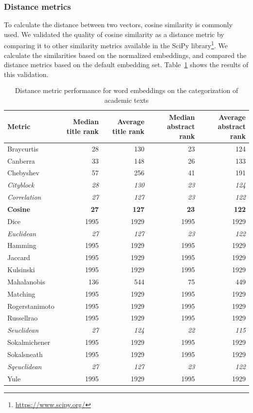 \documentclass[../../Thesis.tex]{subfiles}
\begin{document}
\subsubsection{Distance metrics}
To calculate the distance between two vectors, cosine similarity is commonly used. We validated the quality of cosine similarity as a distance metric by comparing it to other similarity metrics available in the SciPy library\footnote{\url{https://www.scipy.org/}}. We calculate the similarities based on the normalized embeddings, and compared the distance metrics based on the default embedding set. Table~\ref{table:distanceMetrics} shows the results of this validation.\\
\begin{table}[hbt]
\begin{tabular}{|l|r|r|r|r|}
\hline
Metric\footnotemark & Median title rank & Average title rank & Median abstract rank & Average abstract rank  \\
\hline
Braycurtis & 28 & 130 & 23 & 124  \\
\hline
Canberra & 33 & 148 & 26 & 133  \\
\hline
Chebyshev & 57 & 256 & 41 & 191  \\
\hline
\textit{Cityblock} & \textit{28} & \textit{130} & \textit{23} & \textit{124}  \\
\hline
\textit{Correlation} & \textit{27} & \textit{127} & \textit{23} & \textit{122}  \\
\hline
\textbf{Cosine} & \textbf{27} & \textbf{127} & \textbf{23} & \textbf{122}  \\
\hline
Dice & 1995 & 1929 & 1995 & 1929  \\
\hline
\textit{Euclidean} & \textit{27} & \textit{127} & \textit{23} & \textit{122}  \\
\hline
Hamming & 1995 & 1929 & 1995 & 1929  \\
\hline
Jaccard & 1995 & 1929 & 1995 & 1929  \\
\hline
Kulsinski & 1995 & 1929 & 1995 & 1929  \\
\hline
Mahalanobis & 136 & 544 & 75 & 449  \\
\hline
Matching & 1995 & 1929 & 1995 & 1929  \\
\hline
Rogerstanimoto & 1995 & 1929 & 1995 & 1929  \\
\hline
Russellrao & 1995 & 1929 & 1995 & 1929  \\
\hline
\textit{Seuclidean} & \textit{27} & \textit{124} & \textit{22} & \textit{115}  \\
\hline
Sokalmichener & 1995 & 1929 & 1995 & 1929  \\
\hline
Sokalsneath & 1995 & 1929 & 1995 & 1929  \\
\hline
\textit{Sqeuclidean} & \textit{27} & \textit{127} & \textit{23} & \textit{122}  \\
\hline
Yule & 1995 & 1929 & 1995 & 1929  \\
\hline
\end{tabular}
\caption{Distance metric performance for word embeddings on the categorization of academic texts}\label{table:distanceMetrics}
\end{table}
\end{document}
